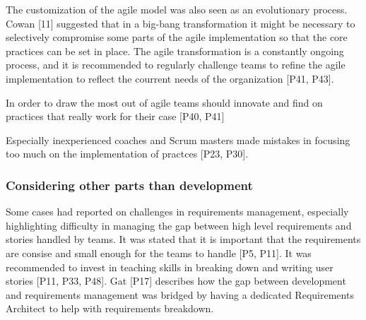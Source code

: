 \documentclass[preprint,authoryear,12pt]{elsarticle}
\begin{document}
The customization of the agile model was also seen as an evolutionary process.
Cowan [11] suggested that in a big-bang transformation it might be necessary to
selectively compromise some parts of the agile implementation so that the core
practices can be set in place.
The agile transformation is a constantly ongoing process, and it is recommended
to regularly challenge teams to refine the agile implementation to reflect the
courrent needs of the organization [P41, P43].


% 

In order to draw the most out of agile teams should innovate and find on
practices that really work for their case [P40, P41]

Especially inexperienced coaches and Scrum masters made mistakes in focusing too
much on the implementation of practces [P23, P30].


\subsubsection{Considering other parts than development}



Some cases had reported on challenges in requirements management, especially
highlighting difficulty in managing the gap between high level requirements and
stories handled by teams. It was stated that it is important that the
requirements are consise and small enough for the teams to handle [P5, P11].
It was recommended to invest in teaching skills in breaking down and writing
user stories [P11, P33, P48]. Gat [P17] describes how the gap between
development and requirements management was bridged by having a dedicated
Requirements Architect to help with requirements breakdown.
\end{document}
